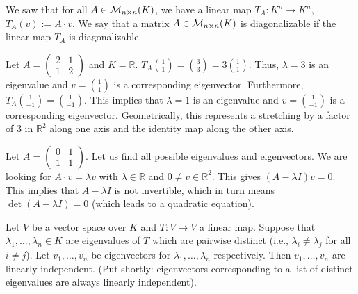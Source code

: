 \begin{remark}\label{rem:diagonalizable_matrix}
  We saw that for all $A \in \mathcal{M}_{n \times n}(K)$, we have a linear map $T_A: K^n \rightarrow K^n$, $T_A(v) := A \cdot v$. We say that a matrix $A \in \mathcal{M}_{n \times n}(K)$ is diagonalizable if the linear map $T_A$ is diagonalizable.
\end{remark}

\begin{example}\label{ex:eigenvalue_R2_stretch}
  Let $A = \left(\begin{smallmatrix} 2 & 1 \\ 1 & 2 \end{smallmatrix}\right)$ and $K = \mathbb{R}$.
  $T_A \binom{1}{1} = \binom{3}{3} = 3 \binom{1}{1}$. Thus, $\lambda = 3$ is an eigenvalue and $v = \binom{1}{1}$ is a corresponding eigenvector.
  Furthermore, $T_A \binom{1}{-1} = \binom{1}{-1}$. This implies that $\lambda = 1$ is an eigenvalue and $v = \binom{1}{-1}$ is a corresponding eigenvector.
  Geometrically, this represents a stretching by a factor of 3 in $\mathbb{R}^2$ along one axis and the identity map along the other axis.
\end{example}

\begin{example}\label{ex:eigenvalue_R2_quadratic}
  Let $A = \left(\begin{smallmatrix} 0 & 1 \\ 1 & 1 \end{smallmatrix}\right)$. Let us find all possible eigenvalues and eigenvectors.
  We are looking for $A \cdot v = \lambda v$ with $\lambda \in \mathbb{R}$ and $0 \ne v \in \mathbb{R}^2$.
  This gives $(A - \lambda I)v = 0$. This implies that $A - \lambda I$ is not invertible, which in turn means $\det(A - \lambda I) = 0$ (which leads to a quadratic equation).
\end{example}

\begin{proposition} \label{prop:lin_indep_eigen}
  Let $V$ be a vector space over $K$ and $T: V \rightarrow V$ a linear map. Suppose that $\lambda_1, \dots, \lambda_n \in K$ are eigenvalues of $T$ which are pairwise distinct (i.e., $\lambda_i \ne \lambda_j$ for all $i \ne j$). Let $v_1, \dots, v_n$ be eigenvectors for $\lambda_1, \dots, \lambda_n$ respectively. Then $v_1, \dots, v_n$ are linearly independent. (Put shortly: eigenvectors corresponding to a list of distinct eigenvalues are always linearly independent).
\end{proposition}


